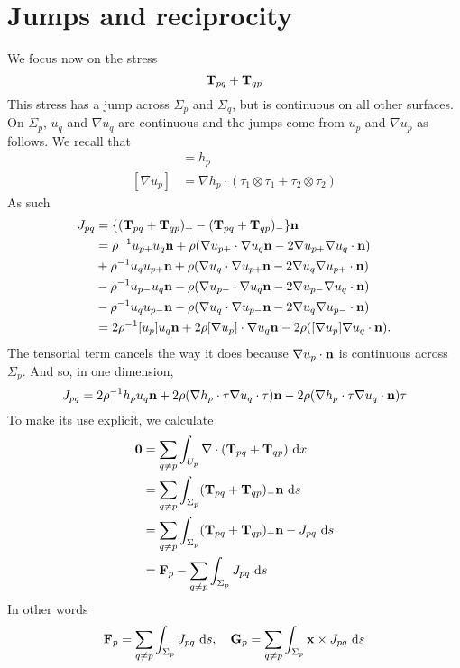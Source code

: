 \documentclass[preprint,11pt]{article}
\begin{document}
\section{Jumps and reciprocity}
We focus now on the stress 
\begin{equation}
{\bf T}_{pq} + {\bf T}_{qp}
\end{equation}
This stress has a jump across $\Sigma_p$ and $\Sigma_q$, but is continuous on all other surfaces.
On $\Sigma_p$, $u_q$ and $\nabla u_q$ are continuous and the jumps come from $u_p$ and $\nabla u_p$
as follows. We recall that 
\begin{align*}
[u_p] &= h_p\\
[\nabla u_p] &= \nabla h_p \cdot (\tau_1 \otimes \tau_1 + \tau_2 \otimes \tau_2)
\end{align*}
As such 
\begin{align*}
J_{pq} &= \{({\bf T}_{pq} + {\bf T}_{qp})_+ - ({\bf T}_{pq} + {\bf T}_{qp})_-\}{\bf n}\\
&= \rho^{-1} u_{p+}u_q {\bf n} + \rho(\nabla u_{p+} \cdot \nabla u_q {\bf n} - 2 \nabla u_{p+} \nabla u_q   \cdot {\bf n})\\ 
&+ \rho^{-1} u_qu_{p+} {\bf n} + \rho(\nabla u_q \cdot \nabla u_{p+} {\bf n} - 2 \nabla u_q    \nabla u_{p+}\cdot {\bf n})\\ 
&- \rho^{-1} u_{p-}u_q {\bf n} - \rho(\nabla u_{p-} \cdot \nabla u_q {\bf n} - 2 \nabla u_{p-} \nabla u_q   \cdot {\bf n})\\
&- \rho^{-1} u_qu_{p-} {\bf n} - \rho(\nabla u_q \cdot \nabla u_{p-} {\bf n} - 2 \nabla u_q    \nabla u_{p-}\cdot {\bf n})\\
&= 2\rho^{-1} [u_p] u_q {\bf n} 
+ 2\rho[\nabla u_p] \cdot \nabla u_q {\bf n}
- 2\rho( [\nabla u_p] \nabla u_q \cdot {\bf n}).
\end{align*}
The tensorial term cancels the way it does because $\nabla u_p \cdot {\bf n}$ is continuous
across $\Sigma_p$. 
And so, in one dimension, 
\begin{equation*}
J_{pq} = 2\rho^{-1} h_p u_q {\bf n} 
+ 2\rho(\nabla h_p \cdot \tau \nabla u_q \cdot \tau) {\bf n} - 2\rho (\nabla h_p \cdot \tau \nabla u_q \cdot {\bf n}) \tau
\end{equation*}
To make its use explicit, we calculate 
\begin{align*}
{\bf 0} 
&= \sum_{q \neq p} \int_{U_p} \nabla \cdot ({\bf T}_{pq} + {\bf T}_{qp}) \,\dif x\\
&= \sum_{q \neq p} \int_{\Sigma_p} ({\bf T}_{pq} + {\bf T}_{qp})_-{\bf n} \,\dif s\\
&= \sum_{q \neq p} \int_{\Sigma_p} ({\bf T}_{pq} + {\bf T}_{qp})_+{\bf n} - J_{pq}\,\dif s\\
&= {\bf F}_p - \sum_{q \neq p} \int_{\Sigma_p}J_{pq}\,\dif s
\end{align*}
In other words
\begin{equation}
{\bf F}_p = \sum_{q \neq p} \int_{\Sigma_p}J_{pq}\,\dif s,\quad
{\bf G}_p = \sum_{q \neq p} \int_{\Sigma_p} {\bf x} \times J_{pq}\,\dif s
\end{equation}
\end{document}
